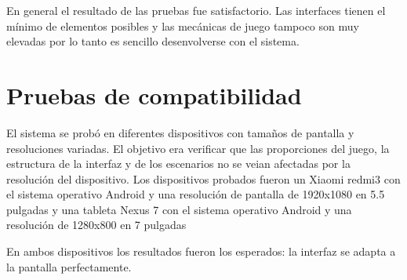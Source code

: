 En general el resultado de las pruebas fue satisfactorio. Las interfaces tienen el mínimo de elementos posibles y las mecánicas de juego tampoco son muy elevadas por lo tanto es sencillo desenvolverse con el sistema.

\section{Pruebas de compatibilidad}

El sistema se probó en diferentes dispositivos con tamaños de pantalla y resoluciones variadas. El objetivo era verificar que las proporciones del juego, la estructura de la interfaz y de los escenarios no se veian afectadas por la resolución del dispositivo. Los dispositivos probados fueron un Xiaomi redmi3 con el sistema operativo Android y una resolución de pantalla de 1920x1080 en  5.5 pulgadas y una tableta Nexus 7 con el sistema operativo Android y una resolución de 1280x800 en 7 pulgadas


En ambos dispositivos los resultados fueron los esperados: la interfaz se adapta a la pantalla perfectamente. 


